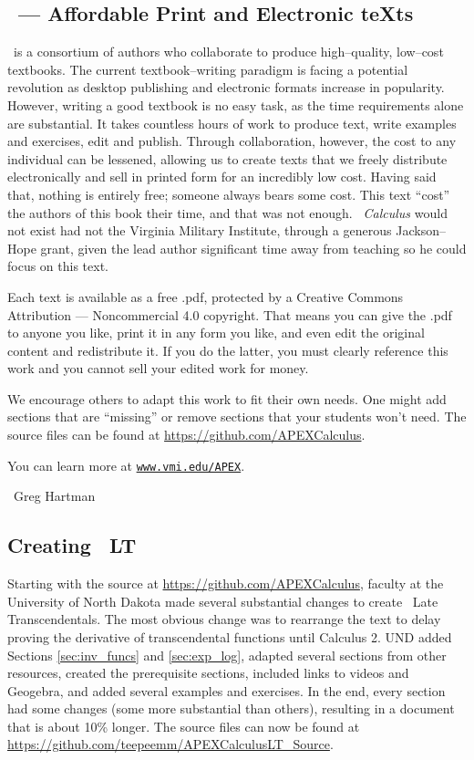 \begin{itemize}
\begin{itemize}
\subsection{\apex\ --- Affordable Print and Electronic teXts}

\apex\ is a consortium of authors  who collaborate to produce high--quality, low--cost textbooks. The current textbook--writing paradigm is facing a potential revolution as desktop publishing and electronic formats increase in popularity. However, writing a good textbook is no easy task, as the time requirements alone are substantial. It takes countless hours of work to produce text, write examples and exercises, edit and publish. Through collaboration, however, the cost to any individual can be lessened, allowing us to create texts that we freely distribute electronically and sell in printed form for an incredibly low cost. Having said that, nothing is entirely free; someone always bears some cost. This text ``cost'' the authors of this book their time, and that was not enough. \textit{\apex\ Calculus} would not exist had not the Virginia Military Institute, through a generous Jackson--Hope grant, given the lead author significant time away from teaching so he could focus on this text.

Each text is available as a free .pdf, protected by a Creative Commons Attribution --- Noncommercial 4.0 copyright. That means you can give the .pdf to anyone you like, print it in any form you like, and even edit the original content and redistribute it. If you do the latter, you must clearly reference this work and you cannot sell your edited work for money.

We encourage others to adapt this work to fit their own needs. One might add sections that are ``missing'' or remove sections that your students won't need. The source files can be found at \url{https://github.com/APEXCalculus}.

You can learn more at \texttt{\href{http://www.vmi.edu/APEX}{www.vmi.edu/APEX}}.

~\hfill Greg Hartman

\subsection{Creating \apex~LT}

Starting with the source at \url{https://github.com/APEXCalculus},
faculty at the University of North Dakota made several substantial changes to create \apex\ Late Transcendentals.  The most obvious change was to rearrange the text to delay proving the derivative of transcendental functions until Calculus 2.  UND added Sections \ref{sec:inv_funcs} and \ref{sec:exp_log}, adapted several sections from other resources, created the prerequisite sections, included links to videos and Geogebra, and added several examples and exercises.  In the end, every section had some changes (some more substantial than others), resulting in a document that is about 10\% longer. The source files can now be found at\iflatexml\ \else\\\fi
\url{https://github.com/teepeemm/APEXCalculusLT_Source}.


\end{itemize}
\end{itemize}
